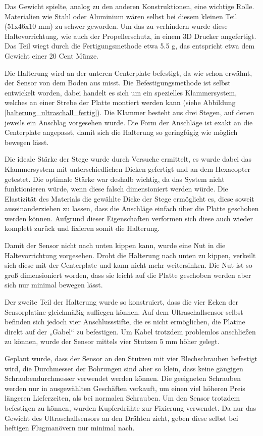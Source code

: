 	Das Gewicht spielte, analog zu den anderen Konstruktionen, eine wichtige Rolle.
	Materialien wie Stahl oder Aluminium wären selbst bei diesem kleinen Teil (51x46x10 mm) zu schwer geworden.
	Um das zu verhindern wurde diese Haltevorrichtung, wie auch der Propellerschutz, in einem 3D Drucker angefertigt.
	Das Teil wiegt durch die Fertigungsmethode etwa 5.5 g, das entspricht etwa dem Gewicht einer 20 Cent Münze.

	Die Halterung wird an der unteren Centerplate befestigt, da wie schon erwähnt, der Sensor von dem Boden aus misst.
	Die Befestigungsmethode ist selbst entwickelt worden, dabei handelt es sich um ein spezielles Klammersystem, welches an einer Strebe der Platte montiert werden kann (siehe Abbildung \ref{halterung_ultraschall_fertig}).
	Die Klammer besteht aus drei Stegen, auf denen jeweils ein Anschlag vorgesehen wurde.
	Die Form der Anschläge ist  exakt an die Centerplate angepasst, damit sich die Halterung so geringfügig wie möglich bewegen lässt.

	Die ideale Stärke der Stege wurde durch Versuche ermittelt, es wurde dabei das Klammersystem mit unterschiedlichen Dicken gefertigt und an dem Hexacopter getestet.
	Die optimale Stärke war deshalb wichtig, da das System nicht funktionieren würde, wenn diese falsch dimensioniert werden würde.
	Die Elastizität des Materials \bzw die gewählte Dicke der Stege ermöglicht es, diese soweit auseinanderziehen zu lassen, dass die Anschläge einfach über die Platte geschoben werden können.
	Aufgrund dieser Eigenschaften verformen sich diese auch wieder komplett zurück und fixieren somit die Halterung.

	Damit der Sensor nicht nach unten kippen kann, wurde eine Nut in die Haltevorrichtung vorgesehen.
	Droht die Halterung nach unten zu kippen, verkeilt sich diese mit der Centerplate und kann nicht mehr weitersinken.
	Die Nut ist so groß dimensioniert worden, dass sie leicht auf die Platte geschoben werden aber sich nur minimal bewegen lässt.

	Der zweite Teil der Halterung wurde so konstruiert, dass die vier Ecken der Sensorplatine gleichmäßig aufliegen können.
	Auf dem Ultraschallsensor selbst befinden sich jedoch vier Anschlussstifte, die es nicht ermöglichen, die Platine direkt auf der „Gabel“ zu befestigen.
	Um Kabel trotzdem problemlos anschließen zu können, wurde der Sensor mittels vier Stutzen 5 mm höher gelegt.

	Geplant wurde, dass der Sensor an den Stutzen mit vier Blechschrauben befestigt wird, die Durchmesser der Bohrungen sind aber so klein, dass keine gängigen Schraubendurchmesser verwendet werden können.
	Die geeigneten Schrauben werden nur in ausgewählten Geschäften verkauft, um einen viel höheren Preis \bzw längeren Lieferzeiten, als bei normalen Schrauben.
	Um den Sensor trotzdem befestigen zu können, wurden Kupferdrähte zur Fixierung verwendet.
	Da nur das Gewicht des Ultraschallsensors an den Drähten zieht, geben diese selbst bei heftigen Flugmanövern nur minimal nach.

